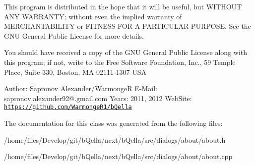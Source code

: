 This program is distributed in the hope that it will be useful, but WITHOUT ANY WARRANTY; without even the implied warranty of MERCHANTABILITY or FITNESS FOR A PARTICULAR PURPOSE. See the GNU General Public License for more details.

You should have received a copy of the GNU General Public License along with this program; if not, write to the Free Software Foundation, Inc., 59 Temple Place, Suite 330, Boston, MA 02111-\/1307 USA

Author: Sapronov Alexander/WarmongeR E-\/Mail: sapronov.alexander92@.gmail.com Years: 2011, 2012 WebSite: \href{https://github.com/WarmongeR1/bQella}{\tt https://github.com/WarmongeR1/bQella} 

The documentation for this class was generated from the following files:\begin{DoxyCompactItemize}
\item 
/home/files/Develop/git/bQella/next/bQella/src/dialogs/about/about.h\item 
/home/files/Develop/git/bQella/next/bQella/src/dialogs/about/about.cpp\end{DoxyCompactItemize}
